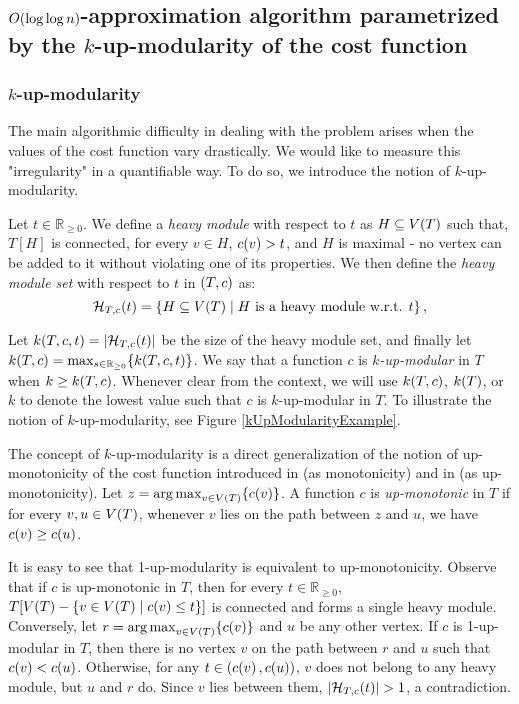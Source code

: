 

\subsection{$O\mathopen{}\left( \log\log n \right)$-approximation algorithm parametrized by the $k$-up-modularity of the cost function}
\subsubsection{$k$-up-modularity}\label{kUpModularity}
The main algorithmic difficulty in dealing with the problem arises when the values of the cost function vary drastically. We would like to measure this "irregularity" in a quantifiable way. To do so, we introduce the notion of $k$-up-modularity.


Let $t\in\mathbb{R}_{\geq0}$. We define a \textit{heavy module} with respect to $t$ as $H\subseteq V\mathopen{}\left( T \right)$ such that, $T[H]$ is connected, for every $v \in H$, $c\mathopen{}\left( v \right) > t$, and $H$ is maximal - no vertex can be added to it without violating one of its properties. We then define the \textit{heavy module set} with respect to $t$ in $\mathopen{}\left( T,c \right)$ as:
$$
\mathcal{H}_{T,c}\mathopen{}\left( t \right)=\mathopen{}\left\{ H\subseteq V\mathopen{}\left( T \right)\mid H \text{ is a heavy module w.r.t. } t \right\},
$$

Let $k\mathopen{}\left( T,c, t \right) = \mathopen{}\left| \mathcal{H}_{T,c}\mathopen{}\left( t \right) \right|$ be the size of the heavy module set, and finally let $k\mathopen{}\left( T,c \right)= \max_{s\in\mathbb{R}_{\geq 0}}\mathopen{}\left\{ k\mathopen{}\left( T,c, t \right) \right\}$. We say that a function $c$ is $k$\textit{-up-modular} in $T$ when $k\geq k\mathopen{}\left( T,c \right)$. Whenever clear from the context, we will use $k\mathopen{}\left( T,c \right)$, $k\mathopen{}\left( T \right)$, or $k$ to denote the lowest value such that $c$ is $k$-up-modular in $T$. To illustrate the notion of $k$-up-modularity, see Figure \ref{kUpModularityExample}.

The concept of $k$-up-modularity is a direct generalization of the notion of up-monotonicity of the cost function introduced in \cite{dereniowski2022CFApproxAlgForBSInTsWithMonoQTimes} (as monotonicity) and in \cite{dereniowski2024SInTsMonoQTs} (as up-monotonicity). Let $z=\operatorname*{arg\,max}_{v\in V\mathopen{}\left( T \right)}\mathopen{}\left\{ c\mathopen{}\left( v \right) \right\}$. A function $c$ is \textit{up-monotonic} in $T$ if for every $v,u\in V\mathopen{}\left( T \right)$, whenever $v$ lies on the path between $z$ and $u$, we have $c\mathopen{}\left( v \right)\geq c\mathopen{}\left( u \right)$. 

It is easy to see that 1-up-modularity is equivalent to up-monotonicity. Observe that if $c$ is up-monotonic in $T$, then for every $t\in\mathbb{R}_{\geq 0}$, $T[V\mathopen{}\left( T \right)-\mathopen{}\left\{ v\in V\mathopen{}\left( T \right)\mid c\mathopen{}\left( v \right)\leq t \right\}]$ is connected and forms a single heavy module. Conversely, let $r=\operatorname*{arg\,max}_{v\in V\mathopen{}\left( T \right)}\mathopen{}\left\{ c\mathopen{}\left( v \right) \right\}$ and $u$ be any other vertex. If $c$ is 1-up-modular in $T$, then there is no vertex $v$ on the path between $r$ and $u$ such that $c\mathopen{}\left( v \right)<c\mathopen{}\left( u \right)$. Otherwise, for any $t\in \mathopen{}\left( c\mathopen{}\left( v \right),c\mathopen{}\left( u \right) \right)$, $v$ does not belong to any heavy module, but $u$ and $r$ do. Since $v$ lies between them, $\spr{\mathcal{H}_{T,c}\br{t}}>1$, a contradiction.


